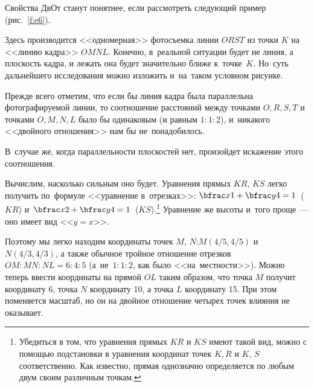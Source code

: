 \smallskip

\hrulefill

\medskip


Свойства ДвОт станут понятнее, если рассмотреть следующий пример (рис.~\ref{f:e6}).


Здесь производится <<одномерная>> фотосъемка линии $ORST$ из точки $K$ на <<линию кадра>> $OMNL$.
Конечно, в~реальной ситуации будет не линия, а плоскость кадра, и лежать она будет значительно
ближе к~точке~$K$. Но~суть дальнейшего исследования можно изложить и~на~таком условном рисунке.

Прежде всего отметим, что если бы линия кадра была параллельна фотографируемой линии, то
соотношение расстояний между точками $O,R,S,T$ и точками $O,M,N,L$ было бы одинаковым
(и равным $1:1:2$), и~никакого <<двойного отношения>> нам бы не~понадобилось.

В~случае же, когда параллельности плоскостей нет, произойдет искажение этого соотношения.

Вычислим, насколько сильным оно будет. Уравнения прямых $KR$, $KS$
легко получить по~формуле <<уравнение в~отрезках>>: $\bfrac x1 + \bfrac y4 = 1$~($KR$)
и~$\bfrac x2 + \bfrac y4 = 1$~($KS$).\footnote{Убедиться в том, что уравнения прямых $KR$ и $KS$
имеют такой вид, можно с помощью подстановки в уравнения координат точек $K,R$ и $K$, $S$ соответственно.
Как известно, прямая однозначно определяется по любым двум своим различным точкам.} Уравнение же высоты
и~того проще~--- оно имеет вид <<$y=x$>>.

Поэтому мы легко находим координаты точек $M$, $N$:\linebreak $M(4/5, 4/5)$ и~$N(4/3, 4/3)$, а также
обычное тройное отношение отрезков $OM : MN : NL = 6:4:5$ (а~не~$1:1:2$, как было <<на~местности>>).
Можно теперь ввести координаты на прямой $OL$ таким образом, что точка $M$ получит координату 6,
точка $N$ координату 10, а точка $L$ координату 15. При этом поменяется масштаб, но он на двойное
отношение четырех точек влияния не оказывает.

